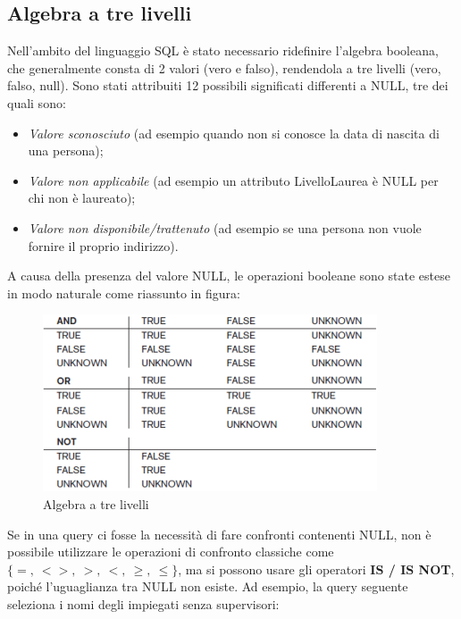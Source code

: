 \subsection{Algebra a tre livelli}

Nell’ambito del linguaggio SQL è stato necessario ridefinire l’algebra booleana, che generalmente consta di 2 valori (vero e falso), rendendola a tre livelli (vero, falso, null). Sono stati attribuiti 12 possibili significati differenti a NULL, tre dei quali sono:

\begin{itemize}

\item{\textit{Valore sconosciuto}} (ad esempio quando non si conosce la data di nascita di una persona);
\item{\textit{Valore non applicabile}} (ad esempio un attributo LivelloLaurea è NULL per chi non è laureato);
\item{\textit{Valore non disponibile/trattenuto}} (ad esempio se una persona non vuole fornire il proprio indirizzo).

\end{itemize}

A causa della presenza del valore NULL, le operazioni booleane sono state estese in modo naturale come riassunto in figura:   

\begin{center}
\begin{figure}[H]
\centering
\includegraphics[scale=1]{figures/three_level_algebra.png}
\caption{Algebra a tre livelli} 
\end{figure}
\end{center}

Se in una query ci fosse la necessità di fare confronti contenenti NULL, non è possibile utilizzare le operazioni di confronto classiche come $\{=,\ <>,\ >,\ <,\ \geq,\ \leq\}$, ma si possono usare gli operatori \textbf{IS / IS NOT}, poiché l’uguaglianza tra NULL non esiste. Ad esempio, la query seguente seleziona i nomi degli impiegati senza supervisori: 

